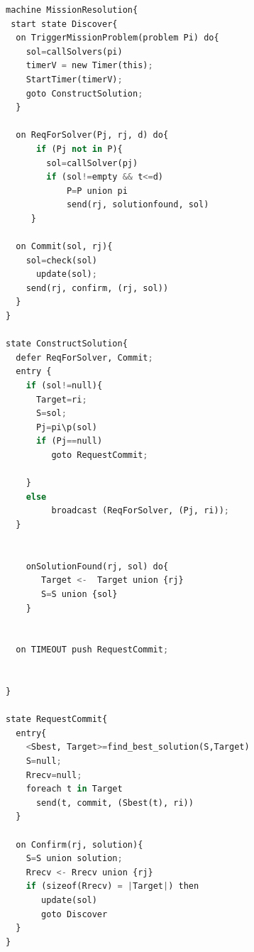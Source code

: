 \documentclass[journal]{IEEEtran}
\theoremstyle{definition}
\begin{document}
\begin{lstlisting}[caption=Mission problem resolution algorithm, language=Python, label=lstMission]
machine MissionResolution{
 start state Discover{
  on TriggerMissionProblem(problem Pi) do{
    sol=callSolvers(pi)
    timerV = new Timer(this);
    StartTimer(timerV);
    goto ConstructSolution;
  }

  on ReqForSolver(Pj, rj, d) do{
      if (Pj not in P){
        sol=callSolver(pj)
        if (sol!=empty && t<=d)
            P=P union pi
            send(rj, solutionfound, sol)
     }
     
  on Commit(sol, rj){
    sol=check(sol)
	  update(sol);
    send(rj, confirm, (rj, sol))
  }
}

state ConstructSolution{  
  defer ReqForSolver, Commit;
  entry {
    if (sol!=null){
      Target=ri;
      S=sol;
      Pj=pi\p(sol)
      if (Pj==null)
         goto RequestCommit;
         
    }
    else
         broadcast (ReqForSolver, (Pj, ri));
  }
    

    onSolutionFound(rj, sol) do{
       Target <-  Target union {rj}
       S=S union {sol}    
    }


  on TIMEOUT push RequestCommit;
  

}

state RequestCommit{
  entry{
    <Sbest, Target>=find_best_solution(S,Target)
    S=null;
    Rrecv=null;
    foreach t in Target
      send(t, commit, (Sbest(t), ri))
  }

  on Confirm(rj, solution){
    S=S union solution;
    Rrecv <- Rrecv union {rj}
    if (sizeof(Rrecv) = |Target|) then 
       update(sol)
       goto Discover
  }
}
\end{lstlisting}



\end{document}
